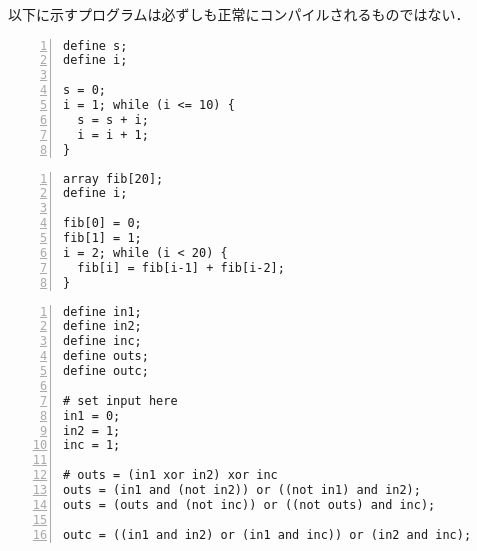 \documentclass[lualatex, a4paper, ja=standard]{bxjsarticle}
\begin{document}
以下に示すプログラムは必ずしも正常にコンパイルされるものではない．

\begin{Verbatim}[frame=lines, numbers=left]
define s;
define i;

s = 0;
i = 1; while (i <= 10) {
  s = s + i;
  i = i + 1;
}
\end{Verbatim}

\begin{Verbatim}[frame=lines, numbers=left]
array fib[20];
define i;

fib[0] = 0;
fib[1] = 1;
i = 2; while (i < 20) {
  fib[i] = fib[i-1] + fib[i-2];
}
\end{Verbatim}

\begin{Verbatim}[frame=lines, numbers=left]
define in1;
define in2;
define inc;
define outs;
define outc;

# set input here
in1 = 0;
in2 = 1;
inc = 1;

# outs = (in1 xor in2) xor inc
outs = (in1 and (not in2)) or ((not in1) and in2);
outs = (outs and (not inc)) or ((not outs) and inc);

outc = ((in1 and in2) or (in1 and inc)) or (in2 and inc);
\end{Verbatim}
\end{document}

